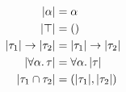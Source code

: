 
\begin{align*}
  \lvert \alpha \rvert                    &= \alpha \\
  \lvert \top \rvert                      &= () \\
  \lvert \tau_1 \rvert \to \lvert \tau_2 \rvert &= \lvert \tau_1 \rvert \to \lvert \tau_2 \rvert \\
  \lvert \forall \alpha. \, \tau \rvert        &= \forall \alpha. \, \lvert \tau \rvert \\
  \lvert \tau_1 \cap \tau_2 \rvert &= (\lvert \tau_1 \rvert, \lvert \tau_2 \rvert) \\
\end{align*}
